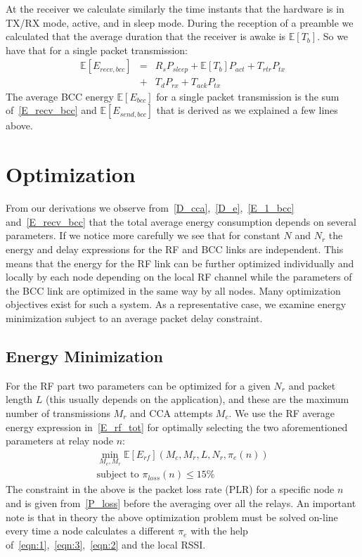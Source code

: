 \documentclass[10pt]{IEEEtran}
\newcounter{section:outage-analysis}
\begin{document}
At the receiver we calculate similarly the time instants that the hardware is in TX/RX mode, active, and in sleep mode. During the reception of a preamble we calculated that the average duration that the receiver is awake is $\mathbb{E}[T_b]$. So we have that for a single packet transmission:
\begin{eqnarray}\label{E_recv_bcc}
    \mathbb{E}[E_{recv,bcc}] &=& R_s P_{sleep}+\mathbb{E}[T_b]  P_{act}+T_{rtr} P_{tx}\nonumber\\&+&T_{d} P_{rx}+T_{ack} P_{tx}
\end{eqnarray}
The average BCC energy $\mathbb{E}[E_{bcc}]$ for a single packet transmission is the sum of~\eqref{E_recv_bcc} and $\mathbb{E}[E_{send,bcc}]$ that is derived as we explained a few lines above.


\section{Optimization}
\label{section:optimization}
From our derivations we observe from~\eqref{D_cca},~\eqref{D_e},~\eqref{E_1_bcc} and~\eqref{E_recv_bcc} that the total average energy consumption depends on several parameters. If we notice more carefully we see that for constant $N$ and $N_r$ the energy and delay expressions for the RF and BCC links are independent. This means that the energy for the RF link can be further optimized individually and locally by each node depending on the local RF channel while the parameters of the BCC link are optimized in the same way by all nodes. Many optimization objectives exist for such a system. As a representative case, we examine energy minimization subject to an average packet delay constraint.

\subsection{Energy Minimization}
For the RF part two parameters can be optimized for a given $N_r$ and packet length $L$ (this usually depends on the application), and these are the maximum number of transmissions $M_r$ and CCA attempts $M_c$. We use the RF average energy expression in~\eqref{E_rf_tot} for optimally selecting the two aforementioned parameters at relay node $n$:
\begin{eqnarray}\label{arg_min_E_rf}
    \min_{M_{c},M_{r}} \mathbb{E} [ E_{rf}](M_c,M_r,L,N_r,\pi_e(n))\\
    \text{subject to } \pi_{loss} (n) \leq 15\% \nonumber
\end{eqnarray}
The constraint in the above is the packet loss rate (PLR) for a specific node $n$ and is given from~\eqref{P_loss} before the averaging over all the relays. An important note is that in theory the above optimization problem must be solved on-line every time a node calculates a different $\pi_e$ with the help of~\eqref{eqn:1},~\eqref{eqn:3},~\eqref{eqn:2} and the local RSSI.
\end{document}
